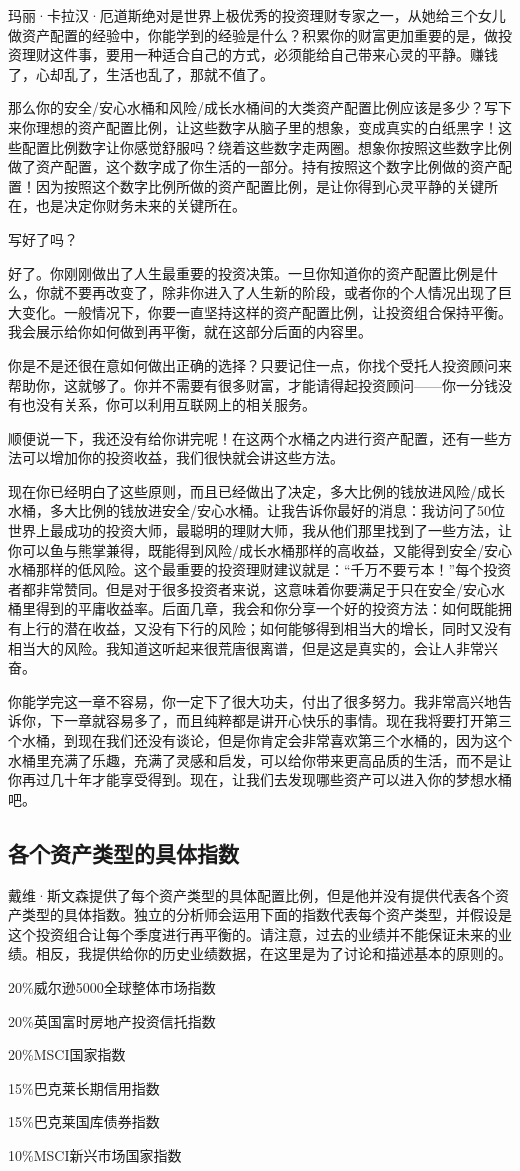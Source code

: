 玛丽·卡拉汉·厄道斯绝对是世界上极优秀的投资理财专家之一，从她给三个女儿做资产配置的经验中，你能学到的经验是什么？积累你的财富更加重要的是，做投资理财这件事，要用一种适合自己的方式，必须能给自己带来心灵的平静。赚钱了，心却乱了，生活也乱了，那就不值了。

那么你的安全/安心水桶和风险/成长水桶间的大类资产配置比例应该是多少？写下来你理想的资产配置比例，让这些数字从脑子里的想象，变成真实的白纸黑字！这些配置比例数字让你感觉舒服吗？绕着这些数字走两圈。想象你按照这些数字比例做了资产配置，这个数字成了你生活的一部分。持有按照这个数字比例做的资产配置！因为按照这个数字比例所做的资产配置比例，是让你得到心灵平静的关键所在，也是决定你财务未来的关键所在。

写好了吗？

好了。你刚刚做出了人生最重要的投资决策。一旦你知道你的资产配置比例是什么，你就不要再改变了，除非你进入了人生新的阶段，或者你的个人情况出现了巨大变化。一般情况下，你要一直坚持这样的资产配置比例，让投资组合保持平衡。我会展示给你如何做到再平衡，就在这部分后面的内容里。

你是不是还很在意如何做出正确的选择？只要记住一点，你找个受托人投资顾问来帮助你，这就够了。你并不需要有很多财富，才能请得起投资顾问——你一分钱没有也没有关系，你可以利用互联网上的相关服务。

顺便说一下，我还没有给你讲完呢！在这两个水桶之内进行资产配置，还有一些方法可以增加你的投资收益，我们很快就会讲这些方法。

现在你已经明白了这些原则，而且已经做出了决定，多大比例的钱放进风险/成长水桶，多大比例的钱放进安全/安心水桶。让我告诉你最好的消息：我访问了50位世界上最成功的投资大师，最聪明的理财大师，我从他们那里找到了一些方法，让你可以鱼与熊掌兼得，既能得到风险/成长水桶那样的高收益，又能得到安全/安心水桶那样的低风险。这个最重要的投资理财建议就是：“千万不要亏本！”每个投资者都非常赞同。但是对于很多投资者来说，这意味着你要满足于只在安全/安心水桶里得到的平庸收益率。后面几章，我会和你分享一个好的投资方法：如何既能拥有上行的潜在收益，又没有下行的风险；如何能够得到相当大的增长，同时又没有相当大的风险。我知道这听起来很荒唐很离谱，但是这是真实的，会让人非常兴奋。

你能学完这一章不容易，你一定下了很大功夫，付出了很多努力。我非常高兴地告诉你，下一章就容易多了，而且纯粹都是讲开心快乐的事情。现在我将要打开第三个水桶，到现在我们还没有谈论，但是你肯定会非常喜欢第三个水桶的，因为这个水桶里充满了乐趣，充满了灵感和启发，可以给你带来更高品质的生活，而不是让你再过几十年才能享受得到。现在，让我们去发现哪些资产可以进入你的梦想水桶吧。

\subsection{各个资产类型的具体指数}

戴维·斯文森提供了每个资产类型的具体配置比例，但是他并没有提供代表各个资产类型的具体指数。独立的分析师会运用下面的指数代表每个资产类型，并假设是这个投资组合让每个季度进行再平衡的。请注意，过去的业绩并不能保证未来的业绩。相反，我提供给你的历史业绩数据，在这里是为了讨论和描述基本的原则的。

20\%威尔逊5000全球整体市场指数

20\%英国富时房地产投资信托指数

20\%MSCI国家指数

15\%巴克莱长期信用指数

15\%巴克莱国库债券指数

10\%MSCI新兴市场国家指数
